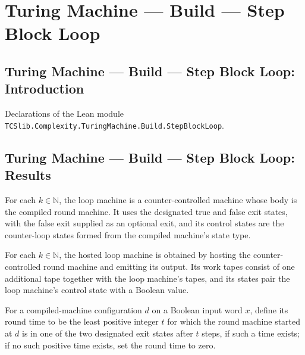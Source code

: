 \section{Turing Machine --- Build --- Step Block Loop}
\subsection*{Turing Machine --- Build --- Step Block Loop: Introduction}

Declarations of the Lean module \texttt{TCSlib.Complexity.TuringMachine.Build.StepBlockLoop}.

\subsection*{Turing Machine --- Build --- Step Block Loop: Results}

\begin{definition}
\label{Turing.StepBlock.loopTM}
\leanok
{}
For each $k\in\mathbb{N}$, the loop machine is a counter-controlled machine whose body
is the compiled round machine. It uses the designated true and false exit states, with
the false exit supplied as an optional exit, and its control states are the counter-loop
states formed from the compiled machine's state type.
\end{definition}

\begin{definition}
\label{Turing.StepBlock.hostedLoopTM}
\leanok
{}
For each $k\in\mathbb{N}$, the hosted loop machine is obtained by hosting the
counter-controlled round machine and emitting its output. Its work tapes consist of one
additional tape together with the loop machine's tapes, and its states pair the loop
machine's control state with a Boolean value.
\end{definition}

\begin{definition}
\label{Turing.StepBlock.loopRoundTime}
\leanok
{}
For a compiled-machine configuration $d$ on a Boolean input word $x$, define its round
time to be the least positive integer $t$ for which the round machine started at $d$ is
in one of the two designated exit states after $t$ steps, if such a time exists; if no
such positive time exists, set the round time to zero.
\end{definition}

